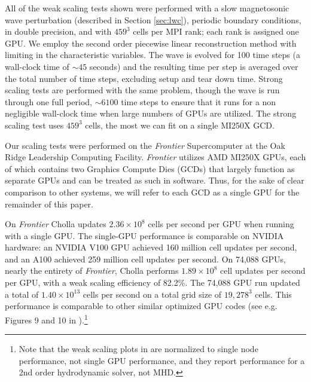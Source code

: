 \documentclass[modern, linenumbers]{aastex631}
\begin{document}
All of the weak scaling tests shown were performed with a slow magnetosonic wave perturbation (described in Section \ref{sec:lwc}), periodic boundary conditions, in double precision, and with $459^3$ cells per MPI rank; each rank is assigned one GPU. We employ the second order piecewise linear reconstruction method with limiting in the characteristic variables. The wave is evolved for 100 time steps (a wall-clock time of $\sim45$ seconds) and the resulting time per step is averaged over the total number of time steps, excluding setup and tear down time. Strong scaling tests are performed with the same problem, though the wave is run through one full period, $\sim 6100$ time steps to ensure that it runs for a non negligible wall-clock time when large numbers of GPUs are utilized. The strong scaling test uses $459^3$ cells, the most we can fit on a single MI250X GCD.

Our scaling tests were performed on the \textit{Frontier} Supercomputer at the Oak Ridge Leadership Computing Facility. \textit{Frontier} utilizes AMD MI250X GPUs, each of which contains two Graphics Compute Dies (GCDs) that largely function as separate GPUs and can be treated as such in software. Thus, for the sake of clear comparison to other systems, we will refer to each GCD as a single GPU for the remainder of this paper.

On \textit{Frontier} Cholla updates $2.36\times10^8$ cells per second per GPU when running with a single GPU. The single-GPU performance is comparable on NVIDIA hardware: an NVIDIA V100 GPU achieved 160 million cell updates per second, and an A100 achieved 259 million cell updates per second. On 74,088 GPUs, nearly the entirety of \textit{Frontier}, Cholla performs $1.89\times10^8$ cell updates per second per GPU, with a weak scaling efficiency of 82.2\%. The 74,088 GPU run updated a total of $1.40\times10^{13}$ cells per second on a total grid size of $19,278^3$ cells. This performance is comparable to other similar optimized GPU codes (see e.g. Figures 9 and 10 in \cite{parthenon_2023}).\footnote{Note that the weak scaling plots in \cite{parthenon_2023} are normalized to single node performance, not single GPU performance, and they report performance for a 2nd order hydrodynamic solver, not MHD.}
\end{document}
